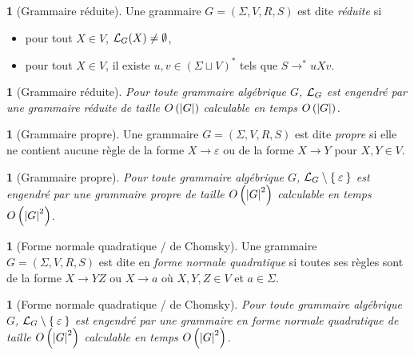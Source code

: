 \documentclass[11pt,a4paper]{article}
\theoremstyle{plain}
\theoremstyle{definition}
\newtheorem{defn}[thm]{\protect\definitionname}
\theoremstyle{definition}
\theoremstyle{remark}
\theoremstyle{remark}
\theoremstyle{plain}
\theoremstyle{plain}
\newtheorem{prop}[thm]{\protect\propositionname}
\theoremstyle{plain}
\theoremstyle{remark}
\providecommand{\definitionname}{Définition}
\providecommand{\propositionname}{Proposition}
\begin{document}
\begin{defn}[Grammaire réduite]
	Une grammaire $G=(\Sigma,V,R,S)$ est dite \emph{réduite} si
	\begin{itemize}
		\item pour tout $X\in V$, $\mathcal{L}_G(X)\not=\emptyset$,
		\item pour tout $X\in V$, il existe $u,v\in(\Sigma\sqcup V)^*$ tels que $S\to^*uXv$.
	\end{itemize}
\end{defn}

\begin{prop}[Grammaire réduite]
	Pour toute grammaire algébrique $G$, $\mathcal{L}_{G}$ est engendré par une grammaire réduite de taille $O\left(\left|G\right|\right)$
	calculable en temps $O\left(\left|G\right|\right)$.
\end{prop}

\begin{defn}[Grammaire propre]
	Une grammaire $G=(\Sigma,V,R,S)$ est dite \emph{propre} si elle ne contient aucune règle de la forme $X\to \varepsilon$ ou de la forme $X\to Y$ pour $X,Y\in V$.
\end{defn}

\begin{prop}[Grammaire propre]
	Pour toute grammaire algébrique $G$, $\mathcal{L}_{G}\setminus\Set{\varepsilon}$ est engendré par une grammaire
	propre de taille $O\left(\left|G\right|^{2}\right)$ calculable en temps $O\left(\left|G\right|^{2}\right)$.
\end{prop}

\begin{defn}[Forme normale quadratique / de Chomsky]
	Une grammaire $G=(\Sigma,V,R,S)$ est dite en \emph{forme normale quadratique} si toutes ses règles sont de la forme $X\to YZ$ ou $X\to a$ où $X,Y,Z\in V$ et $a\in\Sigma$.
\end{defn}

\begin{prop}[Forme normale quadratique / de Chomsky]
	Pour toute grammaire algébrique $G$, $\mathcal{L}_{G}\setminus\Set{\varepsilon}$ est engendré par une grammaire
	en forme normale quadratique de taille $O\left(\left|G\right|^{2}\right)$
	calculable en temps $O\left(\left|G\right|^{2}\right)$.
\end{prop}

\end{document}
